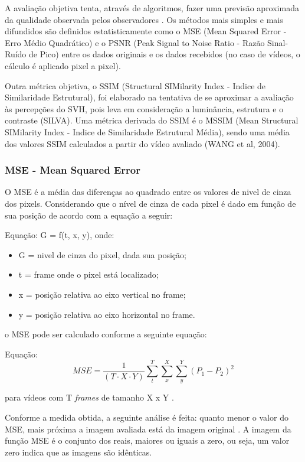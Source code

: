 A avaliação objetiva tenta, através de algoritmos, fazer uma previsão aproximada da qualidade observada pelos observadores \cite{albini}. Os métodos mais simples e mais difundidos são definidos estatisticamente como o MSE (Mean Squared Error - Erro Médio Quadrático) e o PSNR (Peak Signal to Noise Ratio - Razão Sinal-Ruído de Pico) \cite{emmersonsilva} entre os dados originais e os dados recebidos (no caso de vídeos, o cálculo é aplicado pixel a pixel).

Outra métrica objetiva, o SSIM (Structural SIMilarity Index - Indice de Similaridade Estrutural), foi elaborado na tentativa de se aproximar a avaliação às percepções do SVH, pois leva em consideração a luminância, estrutura e o contraste (SILVA). Uma métrica derivada do SSIM é o MSSIM (Mean Structural SIMilarity Index - Indice de Similaridade Estrutural Média), sendo uma média dos valores SSIM calculados a partir do vídeo avaliado (WANG et al, 2004).

\subsubsection[MSE]{MSE - Mean Squared Error}

O MSE é a média das diferenças ao quadrado entre os valores de nivel de cinza dos pixels. Considerando que o nível de cinza de cada pixel é dado em função de sua posição de acordo com a equação a seguir:

Equação: G = f(t, x, y), onde:

\begin{itemize}
	\item G = nivel de cinza do pixel, dada sua posição;
	\item t = frame onde o pixel está localizado;
	\item x = posição relativa ao eixo vertical no frame;
	\item y = posição relativa ao eixo horizontal no frame.
\end{itemize}

o MSE pode ser calculado conforme a seguinte equação:

    Equação: \[MSE = \frac{1}{\left (T \cdot X \cdot Y \right )} \sum_{t}^{T} \sum_{x}^{X} \sum_{y}^{Y} \left ( P_{1} - P_{2} \right )^{2}\]

para vídeos com T \emph{frames} de tamanho X x Y \cite{winkler2005}.

    Conforme a medida obtida, a seguinte análise é feita: quanto menor o valor do MSE, mais próxima a imagem avaliada está da imagem original \cite{albini}. A imagem da função MSE é o conjunto dos reais, maiores ou iguais a zero, ou seja, um valor zero indica que as imagens são idênticas.

